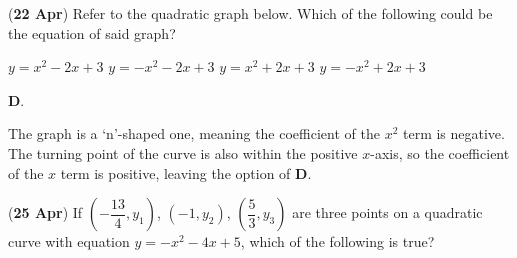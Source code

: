 \documentclass[12pt, answers]{exam} %
\renewcommand{\frac}[2]{\dfrac{#1}{#2}}
\begin{document}
\begin{questions}
	\question (\textbf{22 Apr}) Refer to the quadratic graph below.
	Which of the following could be the equation of said graph?
	\begin{figure}[htpb]
		\centering
		\label{fig:0422}
	\end{figure}
	\begin{choices}
		\choice \(y = x^{2} - 2x + 3\)
		\choice \(y = -x^{2} - 2x + 3\)
		\choice \(y = x^{2} + 2x + 3\)
		\choice \(y = -x^{2} + 2x + 3\)
	\end{choices}
	\begin{solution}
		\textbf{D}.

		The graph is a `n'-shaped one, meaning the coefficient of the \(x^{2}\) term is negative.
		The turning point of the curve is also within the positive \(x\)-axis, so the coefficient
		of the \(x\) term is positive, leaving the option of \textbf{D}.
	\end{solution}

	\question (\textbf{25 Apr}) If \(\left(-\frac{13}{4}, y_{1}\right)\), \(\left(-1, y_{2}\right)\), \(\left(\frac{5}{3}, y_{3}\right)\)
	are three points on a quadratic curve with equation \(y = -x^{2} - 4x + 5\),
	which of the following is true?


\end{questions}
\end{document}
